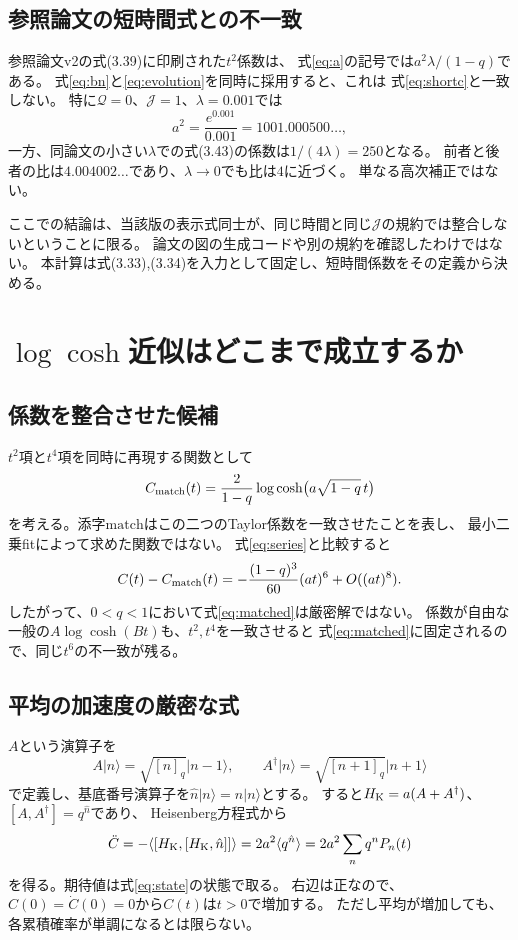 \documentclass[a4paper,11pt]{ltjsarticle}
\numberwithin{equation}{section}
\newcommand{\ket}[1]{\lvert #1\rangle}
\newcommand{\avg}[1]{\langle #1\rangle}
\begin{document}
\subsection{参照論文の短時間式との不一致}
参照論文v2の式(3.39)に印刷された$t^2$係数は、
式\eqref{eq:a}の記号では$a^2\lambda/(1-q)$である。
式\eqref{eq:bn}と\eqref{eq:evolution}を同時に採用すると、これは
式\eqref{eq:shortc}と一致しない。
特に$\mathcal Q=0$、$\mathcal J=1$、$\lambda=0.001$では
\begin{equation}
 a^2=\frac{e^{0.001}}{0.001}=1001.000500\ldots,
 \label{eq:shortnumber}
\end{equation}
一方、同論文の小さい$\lambda$での式(3.43)の係数は$1/(4\lambda)=250$となる。
前者と後者の比は$4.004002\ldots$であり、$\lambda\to0$でも比は$4$に近づく。
単なる高次補正ではない。

ここでの結論は、当該版の表示式同士が、同じ時間と同じ$\mathcal J$の規約では整合しないということに限る。
論文の図の生成コードや別の規約を確認したわけではない。
本計算は式(3.33),(3.34)を入力として固定し、短時間係数をその定義から決める。

\section{$\log\cosh$近似はどこまで成立するか}
\subsection{係数を整合させた候補}
$t^2$項と$t^4$項を同時に再現する関数として
\begin{equation}
 C_{\rm match}(t)=\frac{2}{1-q}
 \log\cosh\bigl(a\sqrt{1-q}\,t\bigr)
 \label{eq:matched}
\end{equation}
を考える。添字$\mathrm{match}$はこの二つのTaylor係数を一致させたことを表し、
最小二乗fitによって求めた関数ではない。
式\eqref{eq:series}と比較すると
\begin{equation}
 C(t)-C_{\rm match}(t)
 =-\frac{(1-q)^3}{60}(at)^6+O((at)^8).
 \label{eq:sixth}
\end{equation}
したがって、$0<q<1$において式\eqref{eq:matched}は厳密解ではない。
係数が自由な一般の$A\log\cosh(Bt)$も、$t^2,t^4$を一致させると
式\eqref{eq:matched}に固定されるので、同じ$t^6$の不一致が残る。

\subsection{平均の加速度の厳密な式}
$A$という演算子を
\begin{equation}
 A\ket n=\sqrt{[n]_q}\ket{n-1},\qquad
 A^\dagger\ket n=\sqrt{[n+1]_q}\ket{n+1}
 \label{eq:ladder}
\end{equation}
で定義し、基底番号演算子を$\hat n\ket n=n\ket n$とする。
すると$H_{\rm K}=a(A+A^\dagger)$、$[A,A^\dagger]=q^{\hat n}$であり、
Heisenberg方程式から
\begin{equation}
 \ddot C=-\avg{[H_{\rm K},[H_{\rm K},\hat n]]}
 =2a^2\avg{q^{\hat n}}
 =2a^2\sum_n q^nP_n(t)
 \label{eq:acceleration}
\end{equation}
を得る。期待値は式\eqref{eq:state}の状態で取る。
右辺は正なので、$C(0)=\dot C(0)=0$から$C(t)$は$t>0$で増加する。
ただし平均が増加しても、各累積確率が単調になるとは限らない。
\end{document}
